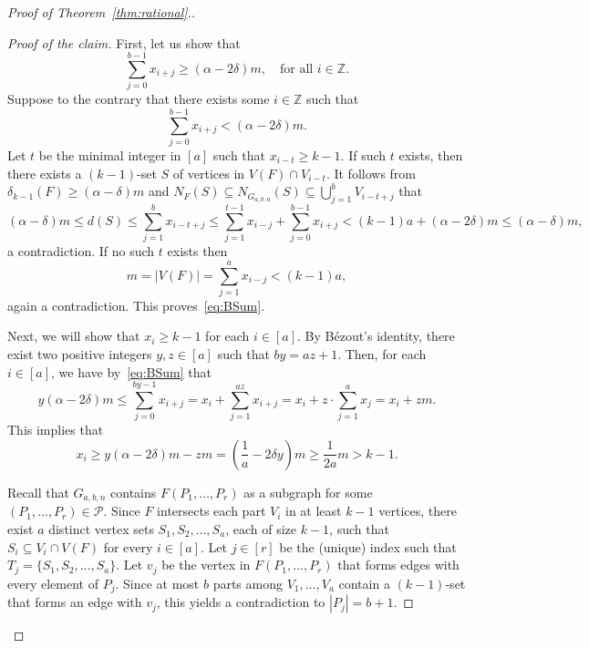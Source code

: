 \documentclass[11pt,a4paper]{article}
\newcommand{\op}[1]{\textcolor{red}{OP: #1}}
\theoremstyle{remark}
\newenvironment{poc}{\begin{proof}[Proof of the claim]\renewcommand*{\qedsymbol}{$\blacksquare$}}{\end{proof}}
\begin{document}
\begin{proof}[Proof of Theorem~\ref{thm:rational}.]
\begin{poc}
First, let us show  that 
\begin{equation}\label{eq:BSum}
\sum_{j=0}^{b-1}x_{i+j} \ge (\alpha- 2\delta)m,\quad
\mbox{for all $i \in \mathbb{Z}$}.
\end{equation}
Suppose to the contrary that there exists some $i \in \mathbb{Z}$ such that \[\sum_{j=0}^{b-1}x_{i+j} < (\alpha- 2\delta)m.\]
Let $t$ be the minimal integer in $[a]$ such that $x_{i-t} \ge k-1$. If such $t$ exists, then there exists a $(k-1)$-set $S$ of vertices in $V(F) \cap V_{i-t}$. It follows from $\delta_{k-1}(F)\ge (\alpha-\delta)m$ and $N_{F}(S)\subseteq N_{G_{a,b,n}}(S) \subseteq \bigcup_{j=1}^b V_{i-t+j}$ that
\[
(\alpha-\delta)m \le d(S) \le \sum^{b}_{j=1}x_{i-t+j} \le \sum^{t-1}_{j=1}x_{i-j} + \sum_{j=0}^{b-1}x_{i+j} < (k-1)a +(\alpha- 2\delta)m \le (\alpha- \delta)m,
\]
a contradiction. If no such $t$ exists then \[m=|V(F)| = \sum^a_{j=1}x_{i-j}< (k-1)a,\] again a contradiction. This proves~\eqref{eq:BSum}.

Next, we will show that $x_i \ge k-1$ for each $i\in [a]$. By B\'ezout's identity, there exist two positive integers $y,z \in [a]$ such that $by = az+1$. Then, for each $i\in [a]$, we have by~\eqref{eq:BSum} that
\[
y(\alpha-2\delta)m \le \sum^{by-1}_{j=0} x_{i+j} = x_i+ \sum^{az}_{j=1}x_{i+j} = x_i +z\cdot\sum^{a}_{j=1}x_j = x_i+zm.  
\]
This implies that 
\[x_i \ge y(\alpha-2\delta)m -zm= \left(\frac{1}{a}-2\delta  y \right)m \ge \frac{1}{2a}m > k-1.\]

Recall that $G_{a,b,n}$ contains $F(P_1,\dots,P_r)$ as a subgraph for some $(P_1,\ldots,P_r) \in \mathcal{P}$.
Since $F$ intersects each part $V_i$ in at least
$k - 1$ vertices, there exist $a$ distinct vertex sets $S_1,S_2,\dots,S_a$, each of size $k-1$, such that $S_i \subseteq V_i\cap V(F)$ for every $i\in[a]$.
Let $j\in [r]$ be the (unique) index such that $T_j = \{S_1,S_2,\dots,S_a\}$. 
Let $v_j$ be the vertex in $F(P_1, \dots, P_r)$ that forms edges with every element of $P_j$.
Since at most $b$ parts among $V_1,\dots,V_a$ contain a $(k-1)$-set that forms an edge with $v_j$, 
this yields a contradiction to $|P_j|=b+1$.
\end{poc}



\end{proof}
\end{document}
